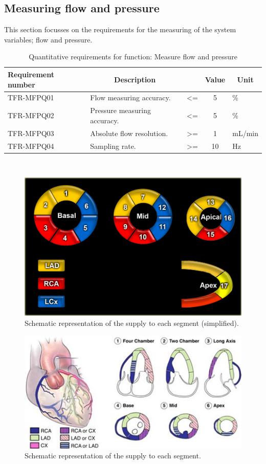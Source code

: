 \subsection{Measuring flow and pressure}
This section focusses on the requirements for the measuring of the system variables; flow and pressure.
\begin{table}[H]
\caption{Quantitative requirements for function: Measure flow and pressure}
\label{tab:measflow_quan}
\begin{tabular}{p{25mm}|p{65mm}ccp{20mm}|}
	\textbf{Requirement number} & \multicolumn{1}{c}{\textbf{Description}} & \multicolumn{1}{c}{ } & \multicolumn{1}{c}{\textbf{Value}} & \multicolumn{1}{c}{\textbf{Unit}} \\
	\hline
	TFR-MFPQ01	& Flow measuring accuracy. 		 			 & <= 		& 5 		& \% \\
	TFR-MFPQ02 	& Pressure measuring accuracy.		 		 & <= 		& 5 		& \% \\
	TFR-MFPQ03 	& Absolute flow resolution.				 	 & >=	 	& 1 		& mL/min \\
	TFR-MFPQ04  & Sampling rate.					 		 & >= 		& 10 		& Hz \\
	\cline{2-5}
\end{tabular} \\
\raggedright
\end{table}

\begin{figure}[H]
	\includegraphics[width=0.5\linewidth]{./images/17_supply.png}
	\caption{Schematic representation of the supply to each segment (simplified)\citep{es2009simple}.}
	\label{fig:segment_supply}
\end{figure}

\begin{figure}[H]
	\includegraphics[width=0.5\linewidth]{./images/17_segment_2.jpg}
	\caption{Schematic representation of the supply to each segment\citep{american2002standardized}.}
	\label{fig:segment_supply2}
\end{figure}

